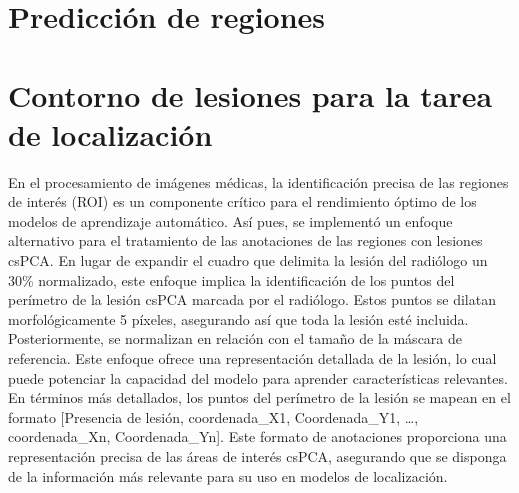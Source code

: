 



\section{Predicción de regiones}






\section{Contorno de lesiones para la tarea de localización}

En el procesamiento de imágenes médicas, la identificación precisa de las regiones de interés (ROI) es un componente crítico para el rendimiento óptimo de los modelos de aprendizaje automático. Así pues, se implementó un enfoque alternativo para el tratamiento de las anotaciones de las regiones con lesiones csPCA. En lugar de expandir el cuadro que delimita la lesión del radiólogo un 30\% normalizado, este enfoque implica la identificación de los puntos del perímetro de la lesión csPCA marcada por el radiólogo. Estos puntos se dilatan morfológicamente 5 píxeles, asegurando así que toda la lesión esté incluida. Posteriormente, se normalizan en relación con el tamaño de la máscara de referencia. Este enfoque ofrece una representación detallada de la lesión, lo cual puede potenciar la capacidad del modelo para aprender características relevantes. En términos más detallados, los puntos del perímetro de la lesión se mapean en el formato [Presencia de lesión, coordenada\_X1, Coordenada\_Y1, …, coordenada\_Xn, Coordenada\_Yn]. Este formato de anotaciones proporciona una representación precisa de las áreas de interés csPCA, asegurando que se disponga de la información más relevante para su uso en modelos de localización.





